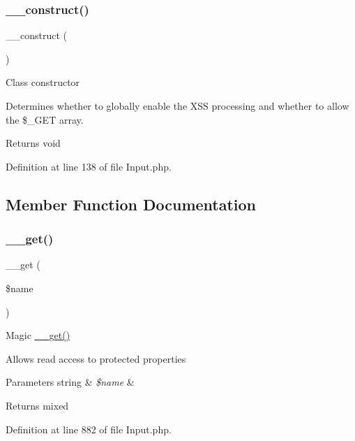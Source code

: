 \subsubsection{\texorpdfstring{\_\_construct()}{\_\_construct()}}
{\footnotesize\ttfamily \+\_\+\+\_\+construct (\begin{DoxyParamCaption}{ }\end{DoxyParamCaption})}

Class constructor

Determines whether to globally enable the X\+SS processing and whether to allow the \$\+\_\+\+G\+ET array.

\begin{DoxyReturn}{Returns}
void 
\end{DoxyReturn}


Definition at line 138 of file Input.\+php.



\subsection{Member Function Documentation}
\mbox{\label{class_c_i___input_abc8e9e31bb15c8a44c3210ec551407c8}} 
\subsubsection{\texorpdfstring{\_\_get()}{\_\_get()}}
{\footnotesize\ttfamily \+\_\+\+\_\+get (\begin{DoxyParamCaption}\item[{}]{\$name }\end{DoxyParamCaption})}

Magic \mbox{\hyperlink{class_c_i___input_abc8e9e31bb15c8a44c3210ec551407c8}{\+\_\+\+\_\+get()}}

Allows read access to protected properties


\begin{DoxyParams}[1]{Parameters}
string & {\em \$name} & \\
\hline
\end{DoxyParams}
\begin{DoxyReturn}{Returns}
mixed 
\end{DoxyReturn}


Definition at line 882 of file Input.\+php.

\mbox{\label{class_c_i___input_a9c594152e7b189a290f6425df8712b73}} 
